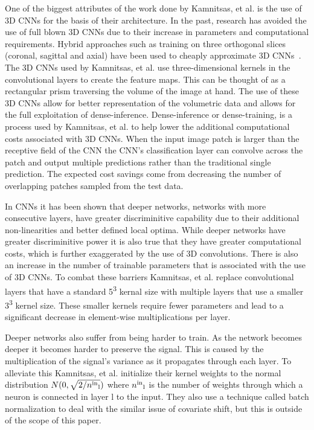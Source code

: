\documentclass{sig-alternate}
\begin{document}
One of the biggest attributes of the work done by Kamnitsas, et al. is the use of 3D CNNs for the basis of their architecture. In the past, research has avoided the use of full blown 3D CNNs due to their increase in parameters and computational requirements.  Hybrid approaches such as training on three orthogonal slices (coronal, sagittal and axial) have been used to cheaply approximate 3D CNNs~\cite{Roth:2014}. The 3D CNNs used by Kamnitsas, et al. use three-dimensional kernels in the convolutional layers to create the feature maps. This can be thought of as a rectangular prism traversing the volume of the image at hand. The use of these 3D CNNs allow for better representation of the volumetric data and allows for the full exploitation of dense-inference. Dense-inference or dense-training, is a process used by Kamnitsas, et al. to help lower the additional computational costs associated with 3D CNNs. When the input image patch is larger than the receptive field of the CNN the CNN's classification layer can convolve across the patch and output multiple predictions rather than the traditional single prediction. The expected cost savings come from decreasing the number of overlapping patches sampled from the test data.


In CNNs it has been shown that deeper networks, networks with more consecutive layers, have greater discriminitive capability due to their additional non-linearities and better defined local optima. While deeper networks have greater discriminitive power it is also true that they have greater computational costs, which is further exaggerated by the use of 3D convolutions. There is also an increase in the number of trainable parameters that is associated with the use of 3D CNNs. To combat these barriers Kamnitsas, et al. replace convolutional layers that have a standard 5\textsuperscript{3} kernal size with multiple layers that use a smaller 3\textsuperscript{3} kernel size. These smaller kernels require fewer parameters and lead to a significant decrease in element-wise multiplications per layer.~\cite{Kamnitsas:2017}

Deeper networks also suffer from being harder to train. As the network becomes deeper it becomes harder to preserve the signal. This is caused by the multiplication of the signal's variance as it propagates through each layer. To alleviate this Kamnitsas, et al. initialize their kernel weights to the normal distribution $N(0,\sqrt{2/n\textsuperscript{in}\textsubscript{l}})$ where $n\textsuperscript{in}\textsubscript{l}$ is the number of weights through which a neuron is connected in layer l to the input. They also use a technique called batch normalization to deal with the similar issue of covariate shift, but this is outside of the scope of this paper.
\end{document}
